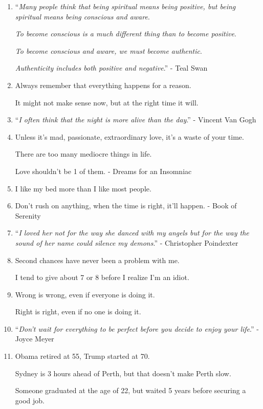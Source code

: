 \documentclass{article}
\numberwithin{equation}{section}
\begin{document}
\begin{enumerate}
    The world will adjust.
    \item ``\textit{Many people think that being spiritual means being positive, but being spiritual means being conscious and aware}.
    
    \textit{To become conscious is a much different thing than to become positive}.
    
    \textit{To become conscious and aware, we must become authentic}.
    
    \textit{Authenticity includes both positive and negative}.'' - Teal Swan
    \item Always remember that everything happens for a reason.
    
    It might not make sense now, but at the right time it will.
    \item ``\textit{I often think that the night is more alive than the day}.'' - Vincent Van Gogh
    \item Unless it's mad, passionate, extraordinary love, it's a waste of your time.
    
    There are too many mediocre things in life.
    
    Love shouldn't be 1 of them. - Dreams for an Insomniac
    \item I like my bed more than I like most people.
    \item Don't rush on anything, when the time is right, it'll happen. - Book of Serenity
    \item ``\textit{I loved her not for the way she danced with my angels but for the way the sound of her name could silence my demons}.'' - Christopher Poindexter
    \item Second chances have never been a problem with me.
    
    I tend to give about 7 or 8 before I realize I'm an idiot.
    \item Wrong is wrong, even if everyone is doing it.
    
    Right is right, even if no one is doing it.
    \item ``\textit{Don't wait for everything to be perfect before you decide to enjoy your life}.'' - Joyce Meyer
    \item Obama retired at 55, Trump started at 70.
    
    Sydney is 3 hours ahead of Perth, but that doesn't make Perth slow.
    
    Someone graduated at the age of 22, but waited 5 years before securing a good job.
    

\end{enumerate}
\end{document}
